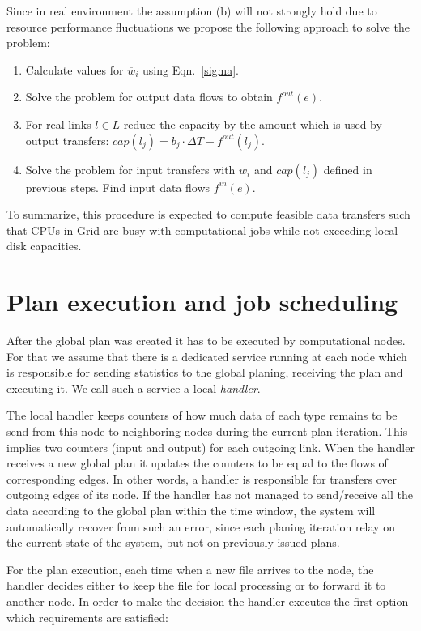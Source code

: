 \documentclass{svjour3}                     %
\begin{document}
Since in real environment the assumption (b) will not strongly hold due to
resource performance fluctuations we propose the following approach to
solve the problem:
%
\begin{enumerate}
\item Calculate values for $\overline{w}_{i}$ using Eqn.~\ref{sigma}.
\item Solve the problem for output data flows to obtain $f^{out}(e)$.
\item For real links $l \in L$ reduce the capacity by the amount which is used by output transfers: $cap(l_{j}) = b_{j} \cdot \Delta T - f^{out}(l_{j})$.
\item Solve the problem for input transfers with $w_{i}$ and $cap(l_{j})$ defined in previous steps. Find input data flows $f^{in}(e)$.
\end{enumerate}
%
To summarize, this procedure is expected to compute feasible data transfers 
such that CPUs in Grid are busy with computational jobs while not exceeding 
local disk capacities.

\section{Plan execution and job scheduling}
\label{plan-execution}
After the global plan was created it has to be executed by computational
nodes. For that we assume that there is a dedicated service running at each node
which is responsible for sending statistics to the global planing, receiving the plan and executing it. We call such a service a local \textit{handler}.

The local handler keeps counters of how much data of each type remains to be send from this node to neighboring nodes during the current plan iteration. This implies two counters (input and output) for each outgoing link. When the handler receives a new global plan it updates the counters to be equal to the flows of corresponding edges. In other words, a handler is responsible for transfers over outgoing edges of its node. If the handler has not managed to send/receive all the data according to the global plan within the time window, the system will automatically recover from such an error, since each planing iteration relay on the current state of the system, but not on previously issued plans.  

For the plan execution, each time when a new file arrives to the node, the handler decides either to keep the file for local processing or to forward it to another node. In order to make the decision the handler executes the first option which requirements are satisfied:
\end{document}
